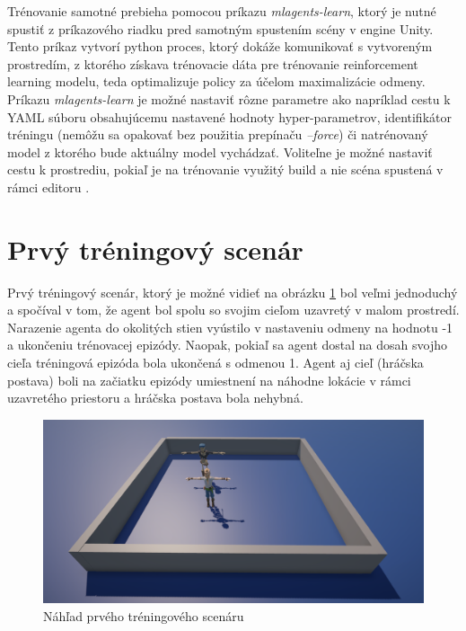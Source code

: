 \documentclass[slovak, master]{diploma}
\begin{document}
Trénovanie samotné prebieha pomocou príkazu \textit{mlagents-learn}, ktorý je nutné spustiť z príkazového riadku pred samotným spustením scény v engine Unity. Tento príkaz vytvorí python proces, ktorý dokáže komunikovať s vytvoreným prostredím, z ktorého získava trénovacie dáta pre trénovanie reinforcement learning modelu, teda optimalizuje policy za účelom maximalizácie odmeny. Príkazu \textit{mlagents-learn} je možné nastaviť rôzne parametre ako napríklad cestu k YAML súboru obsahujúcemu nastavené hodnoty hyper-parametrov, identifikátor tréningu (nemôžu sa opakovať bez použitia prepínaču \textit{--force}) či natrénovaný model z ktorého bude aktuálny model vychádzať. Voliteľne je možné nastaviť cestu k prostrediu, pokiaľ je na trénovanie využitý build a nie scéna spustená v rámci editoru \cite{mlagentLearn}.

\section{Prvý tréningový scenár}
\label{sec:FirstScenario}
Prvý tréningový scenár, ktorý je možné vidieť na obrázku \ref{pic:firstScenario} bol veľmi jednoduchý a spočíval v tom, že agent bol spolu so svojim cieľom uzavretý v malom prostredí. Narazenie agenta do okolitých stien vyústilo v nastaveniu odmeny na hodnotu -1 a ukončeniu trénovacej epizódy. Naopak, pokiaľ sa agent dostal na dosah svojho cieľa tréningová epizóda bola ukončená s odmenou 1. Agent aj cieľ (hráčska postava) boli na začiatku epizódy umiestnení na náhodne lokácie v rámci uzavretého priestoru a hráčska postava bola nehybná. 

\begin{figure}[!htbp]
    \centering
    \includegraphics[width=.75\textwidth]{Figures/scenar1.png}
    \caption{Náhľad prvého tréningového scenáru}
    \label{pic:firstScenario}
\end{figure}
\end{document}
